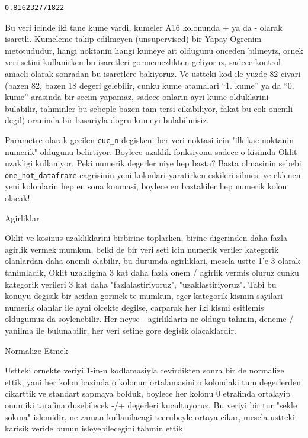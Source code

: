 \documentclass[12pt,fleqn]{article}\usepackage{../common}
\begin{document}
\begin{verbatim}
0.816232771822
\end{verbatim}

Bu veri icinde iki tane kume vardi, kumeler A16 kolonunda + ya da - olarak
isaretli. Kumeleme takip edilmeyen (unsupervised) bir Yapay Ogrenim
metotududur, hangi noktanin hangi kumeye ait oldugunu onceden bilmeyiz,
ornek veri setini kullanirken bu isaretleri gormemezlikten geliyoruz,
sadece kontrol amacli olarak sonradan bu isaretlere bakiyoruz. Ve ustteki
kod ile yuzde 82 civari (bazen 82, bazen 18 degeri gelebilir, cunku kume
atamalari ``1. kume'' ya da ``0. kume'' arasinda bir secim yapamaz, sadece
onlarin ayri kume olduklarini bulabilir, tahminler bu sebeple bazen tam
tersi cikabiliyor, fakat bu cok onemli degil) oraninda bir basariyla dogru
kumeyi bulabilmisiz.

Parametre olarak gecilen \verb!euc_n! degiskeni her veri noktasi icin "ilk
kac noktanin numerik" oldugunu belirtiyor. Boylece uzaklik fonksiyonu
sadece o kisimda Oklit uzakligi kullaniyor. Peki numerik degerler niye hep
basta?  Basta olmasinin sebebi \verb!one_hot_dataframe! cagrisinin yeni
kolonlari yaratirken eskileri silmesi ve eklenen yeni kolonlarin hep en
sona konmasi, boylece en bastakiler hep numerik kolon olacak!

Agirliklar

Oklit ve kosinus uzakliklarini birbirine toplarken, birine digerinden
daha fazla agirlik vermek mumkun, belki de bir veri seti icin numerik
veriler kategorik olanlardan daha onemli olabilir, bu durumda
agirliklari, mesela ustte 1'e 3 olarak tanimladik, Oklit uzakligina 3
kat daha fazla onem / agirlik vermis oluruz cunku kategorik verileri 3
kat daha "fazlalastiriyoruz", "uzaklastiriyoruz". Tabi bu konuyu
degisik bir acidan gormek te mumkun, eger kategorik kismin sayilari
numerik olanlar ile ayni olcekte degilse, carparak her iki kismi
esitlemis oldugumuz da soylenebilir. Her neyse - agirliklarin ne
oldugu tahmin, deneme / yanilma ile bulunabilir, her veri setine gore
degisik olacaklardir.

Normalize Etmek

Ustteki ornekte veriyi 1-in-n kodlamasiyla cevirdikten sonra bir de
normalize ettik, yani her kolon bazinda o kolonun ortalamasini o
kolondaki tum degerlerden cikarttik ve standart sapmaya bolduk,
boylece her kolonu 0 etrafinda ortalayip onun iki tarafina dusebilecek
-/+ degerleri kucultuyoruz. Bu veriyi bir tur "sekle sokma" islemidir,
ne zaman kullanilacagi tecrubeyle ortaya cikar, mesela ustteki karisik
veride bunun isleyebilecegini tahmin ettik. 
\end{document}
